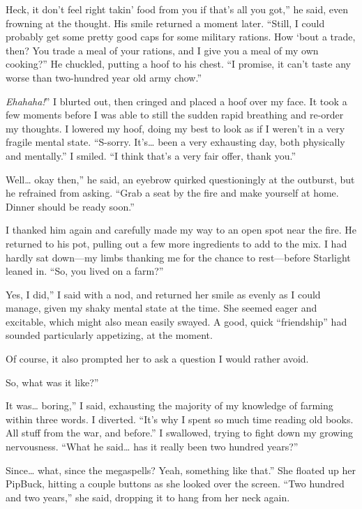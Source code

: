 \leavevmode{}Heck, it don’t feel right takin’ food from you if that’s all you got,” he said, even frowning at the thought. His smile returned a moment later. “Still, I could probably get some pretty good caps for some military rations. How ‘bout a trade, then? You trade a meal of your rations, and I give you a meal of my own cooking?” He chuckled, putting a hoof to his chest. “I promise, it can’t taste any worse than two-hundred year old army chow.”

\leavevmode{}\textit{Ehahaha!}” I blurted out, then cringed and placed a hoof over my face. It took a few moments before I was able to still the sudden rapid breathing and re-order my thoughts. I lowered my hoof, doing my best to look as if I weren’t in a very fragile mental state. “S-sorry. It’s… been a very exhausting day, both physically and mentally.” I smiled. “I think that’s a very fair offer, thank you.”

\leavevmode{}Well… okay then,” he said, an eyebrow quirked questioningly at the outburst, but he refrained from asking. “Grab a seat by the fire and make yourself at home. Dinner should be ready soon.”

I thanked him again and carefully made my way to an open spot near the fire. He returned to his pot, pulling out a few more ingredients to add to the mix. I had hardly sat down—my limbs thanking me for the chance to rest—before Starlight leaned in. “So, you lived on a farm?”

\leavevmode{}Yes, I did,” I said with a nod, and returned her smile as evenly as I could manage, given my shaky mental state at the time. She seemed eager and excitable, which might also mean easily swayed. A good, quick “friendship” had sounded particularly appetizing, at the moment.

Of course, it also prompted her to ask a question I would rather avoid.

\leavevmode{}So, what was it like?”

\leavevmode{}It was… boring,” I said, exhausting the majority of my knowledge of farming within three words. I diverted. “It’s why I spent so much time reading old books. All stuff from the war, and before.” I swallowed, trying to fight down my growing nervousness. “What he said… has it really been two hundred years?”

\leavevmode{}Since… what, since the megaspells? Yeah, something like that.” She floated up her PipBuck, hitting a couple buttons as she looked over the screen. “Two hundred and two years,” she said, dropping it to hang from her neck again.

